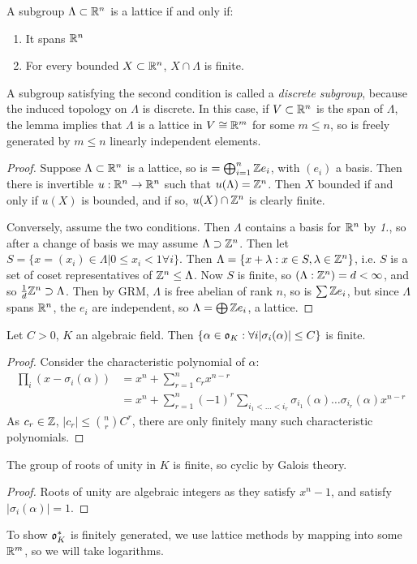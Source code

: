 \documentclass[10pt,a4paper]{article}
\begin{document}
\begin{lemma}
A subgroup $\Lambda \subset \mathbb{R}^n$ is a lattice if and only if:
\begin{enumerate}
\item It spans $\mathbb{R}^n$
\item For every bounded $X \subset \mathbb{R}^n$, $X\cap \Lambda$ is finite.
\end{enumerate}
\end{lemma}
A subgroup satisfying the second condition is called a \emph{discrete subgroup}, because the induced topology on $\Lambda$ is discrete. In this case, if $V \subset \mathbb{R}^n$ is the span of $\Lambda$, the lemma implies that $\Lambda$ is a lattice in $V \cong \mathbb{R}^m$ for some $m \leq n$, so is freely generated by $m \leq n$ linearly independent elements.
\begin{proof}
Suppose $\Lambda \subset \mathbb{R}^n$ is a lattice, so is $=\bigoplus_{i=1}^n \mathbb{Z} e_i$, with $(e_i)$ a basis. Then there is invertible $u : \mathbb{R}^n \to \mathbb{R}^n$ such that $u(\Lambda) = \mathbb{Z}^n$. Then $X$ bounded if and only if $u(X)$ is bounded, and if so, $u(X) \cap \mathbb{Z}^n$ is clearly finite.

Conversely, assume the two conditions. Then $\Lambda$ contains a basis for $\mathbb{R}^n$ by \textit{1.}, so after a change of basis we may assume $\Lambda \supset \mathbb{Z}^n$. Then let $S = \{x = (x_i)\in \Lambda | 0 \leq x_i < 1 \forall i\}$. Then $\Lambda = \{x+\lambda : x \in S, \lambda \in \mathbb{Z}^n\}$, i.e. $S$ is a set of coset representatives of $\mathbb{Z}^n \leq \Lambda$. Now $S$ is finite, so $(\Lambda : \mathbb{Z}^n) = d < \infty$, and so $\frac1d\mathbb{Z}^n \supset \Lambda$. Then by GRM, $\Lambda$ is free abelian of rank $n$, so is $\sum \mathbb{Z} e_i$, but since $\Lambda$ spans $\mathbb{R}^n$, the $e_i$ are independent, so $\Lambda = \bigoplus \mathbb{Z} e_i$, a lattice.
\end{proof}
\begin{lemma}
Let $C > 0$, $K$ an algebraic field. Then $\{\alpha \in \mathfrak{o}_K : \forall i |\sigma_i(\alpha)| \leq C\}$ is finite.
\end{lemma}
\begin{proof}
Consider the characteristic polynomial of $\alpha$:
\begin{align*}
\prod_i(x-\sigma_i(\alpha)) &= x^n + \sum_{r=1}^n c_r x^{n-r} \\
&= x^n + \sum_{r=1}^n (-1)^r \sum_{i_1<\ldots<i_r} \sigma_{i_1}(\alpha)\ldots\sigma_{i_r}(\alpha) x^{n-r}
\end{align*}
As $c_r \in \mathbb{Z}$, $|c_r| \leq \binom{n}{r}C^r$, there are only finitely many such characteristic polynomials.
\end{proof}
\begin{corollary}
The group of roots of unity in $K$ is finite, so cyclic by Galois theory.
\end{corollary}
\begin{proof}
Roots of unity are algebraic integers as they satisfy $x^n-1$, and satisfy $|\sigma_i(\alpha)| = 1$.
\end{proof}
To show $\mathfrak{o}_K^{\ast}$ is finitely generated, we use lattice methods by mapping into some $\mathbb{R}^m$, so we will take logarithms.
\end{document}
